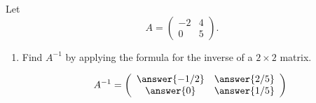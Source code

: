 \documentclass{ximera}
\author{Parisa Fatheddin}
\begin{document}
\begin{exercise}
  Let
  \[
    A= \left(
      \begin{array}{cc}
        -2 & 4 \\
        0 & 5
      \end{array}
    \right).
  \]
  \begin{enumerate}
  \item Find $A^{-1}$ by applying the formula for the inverse of a $2\times
    2$ matrix.
    \begin{prompt}
      \[
        A^{-1} = \left(
          \begin{array}{cc} \answer{-1/2} & \answer{2/5}\\
            \answer{0} & \answer{1/5}
          \end{array}
        \right)
      \]
    \end{prompt}


\end{enumerate}
\end{exercise}
\end{document}
